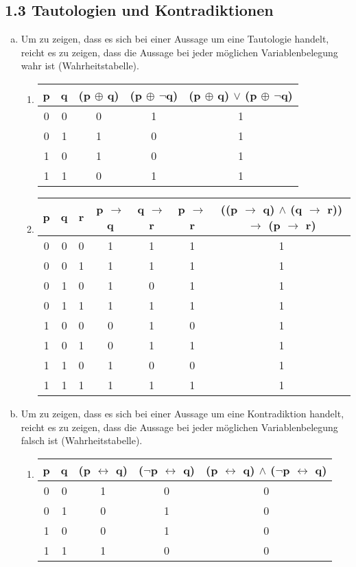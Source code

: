 \documentclass[12pt,a4paper]{article}
\begin{document}
\subsection*{1.3 Tautologien und Kontradiktionen}
\begin{enumerate}[a)]
\item
Um zu zeigen, dass es sich bei einer Aussage um eine Tautologie handelt, reicht es zu zeigen, dass die Aussage bei jeder möglichen Variablenbelegung wahr ist (Wahrheitstabelle).
\begin{enumerate}[1)]
\item
\begin{tabular}{c|c|c|c|c}
p & q & (p $\oplus$ q) & (p $\oplus$ $\neg$q) & (p $\oplus$ q) $\lor$ (p $\oplus$ $\neg$q)\\
\hline
0 & 0 & 0 & 1 & 1\\
0 & 1  & 1 & 0 & 1\\
1 & 0 & 1 & 0 & 1\\
1 & 1 & 0 & 1& 1\\
\end{tabular}

\item
\begin{tabular}{c|c|c|c|c|c|c}
p & q & r & p $\rightarrow$ q & q $\rightarrow$ r & p $\rightarrow$ r & ((p $\rightarrow $ q) $\land$ (q $\rightarrow$ r)) $\rightarrow$ (p $\rightarrow$ r)\\
\hline
0 & 0 & 0 & 1 & 1 & 1 & 1\\
0 & 0 & 1 & 1 & 1 & 1 & 1\\
0 & 1 & 0 & 1 & 0 & 1 & 1\\
0  & 1 & 1 & 1 & 1 & 1 & 1\\
1 & 0 & 0 & 0 & 1 & 0 & 1\\
1 & 0 & 1 & 0 & 1 & 1 & 1\\
1 & 1 & 0 & 1 & 0 & 0 & 1\\
1 & 1 & 1 & 1 & 1 & 1 & 1\\
\end{tabular}
\end{enumerate}
\item Um zu zeigen, dass es sich bei einer Aussage um eine Kontradiktion handelt, reicht es zu zeigen, dass die Aussage bei jeder möglichen Variablenbelegung falsch ist (Wahrheitstabelle).
\begin{enumerate}[1)]
\item
\begin{tabular}{c|c|c|c|c}
p & q & (p $\leftrightarrow$ q) & ($\neg$p $\leftrightarrow$ q) & (p $\leftrightarrow$ q) $\land$ ($\neg$p $\leftrightarrow$ q) \\
\hline
0 & 0 & 1 & 0 & 0\\
0 & 1  & 0 & 1 & 0\\
1 & 0 & 0& 1 & 0\\
1 & 1 & 1 & 0 & 0\\
\end{tabular}



\end{enumerate}
\end{enumerate}
\end{document}
